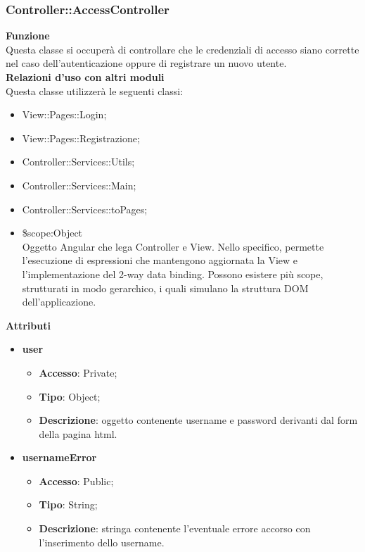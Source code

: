 {	\subsubsection{Controller::\-AccessController}{
		\label{sub:AccessController}
		\textbf{Funzione}\\
			\indent Questa classe si occuperà di controllare che le credenziali di accesso siano corrette nel caso dell'autenticazione oppure di registrare un nuovo utente.\\
		\textbf{Relazioni d'uso con altri moduli}\\
			\indent Questa classe utilizzerà le seguenti classi:
		\begin{itemize}
			\item View::\-Pages::\-Login;
			\item View::\-Pages::\-Registrazione;
			\item Controller::Services::\-Utils;
			\item Controller::Services::\-Main;
			\item Controller::Services::\-toPages;
			\item \$scope:Object\\
	    		\indent Oggetto Angular che lega Controller e View. Nello specifico, permette l'esecuzione di espressioni che mantengono aggiornata la View e l'implementazione del 2-way data binding. Possono esistere più scope, strutturati in modo gerarchico, i quali simulano la struttura DOM dell'applicazione.
		\end{itemize}
		\textbf{Attributi}\\
	    \begin{itemize}
	    	\item \textbf{user}
			\begin{itemize}
				\item \textbf{Accesso}: Private;
				\item \textbf{Tipo}: Object;
				\item \textbf{Descrizione}: oggetto contenente username e password derivanti dal form della pagina html.
			\end{itemize}
			\item \textbf{usernameError}
			\begin{itemize}
				\item \textbf{Accesso}: Public;
				\item \textbf{Tipo}: String;
				\item \textbf{Descrizione}: stringa contenente l'eventuale errore accorso con l'inserimento dello username.

\end{itemize}
\end{itemize}}}
